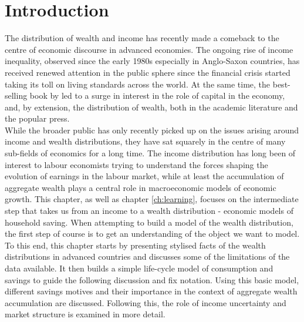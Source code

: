 \section{Introduction}

The distribution of wealth and income has recently made a comeback to the
centre of economic discourse in advanced economies. The ongoing rise of
income inequality, observed since the early 1980s especially in Anglo-Saxon
countries, has received renewed attention in the public sphere since the
financial crisis started taking its toll on living standards across the world. At
the same time, the best-selling book by \citet{Piketty2014} led to a surge
in interest in the role of capital in the economy, and, by extension, the
distribution of wealth, both in the academic literature and the popular
press. \\
While the broader public has only recently picked up on the issues arising
around income and wealth distributions, they have sat squarely in the centre
of many sub-fields of economics for a long time. The income distribution has
long been of interest to labour economists trying to understand the forces
shaping the evolution of earnings in the labour market, while at least the
accumulation of aggregate wealth plays a central role in macroeconomic
models of economic growth. This chapter, as well as chapter \ref{ch:learning}, 
focuses on the intermediate step that takes us from an
income to a wealth distribution - economic models of household saving.
When attempting to build a model of the wealth distribution, the first
step of course is to get an understanding of the object we want to model.
To this end, this chapter starts by presenting stylised facts of the wealth
distributions in advanced countries and discusses some of the limitations
of the data available. It then builds a simple life-cycle model of consumption
and savings to guide the following discussion and fix notation. Using this
basic model, different savings motives and their importance in the context
of aggregate wealth accumulation are discussed. Following this, the role of
income uncertainty and market structure is examined in more detail.


